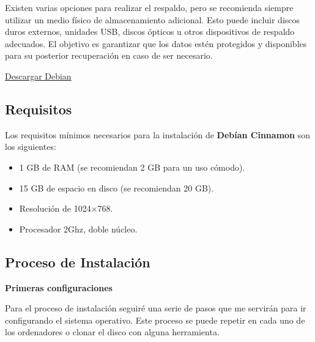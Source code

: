 Existen varias opciones para realizar el respaldo, pero se recomienda siempre utilizar un medio físico de almacenamiento adicional. Esto puede incluir discos duros externos, unidades USB, discos ópticos u otros dispositivos de respaldo adecuados. El objetivo es garantizar que los datos estén protegidos y disponibles para su posterior recuperación en caso de ser necesario.\par 
			
			\begin{tcolorbox}[enhanced,attach boxed title to top center={yshift=-3mm,yshifttext=-1mm},
				colback=blue!5!white,colframe=blue!75!black,colbacktitle=red!80!black,title= Debian,fonttitle=\bfseries, boxed title style={size=small,colframe=red!50!black} ]
		
				\centering
		
				\href{https://cdimage.debian.org/debian-cd/current/amd64/bt-dvd/}{\color{blue}{}Descargar Debian	}
			
			\end{tcolorbox}
				
			\subsection{Requisitos}
				
				Los requisitos mínimos necesarios para la instalación de \textbf{Debían Cinnamon} son los siguientes:
				
				\begin{itemize}
					
					\item 1 GB de RAM (se recomiendan 2 GB para un uso cómodo).
					\item 15 GB de espacio en disco (se recomiendan 20 GB).
					\item Resolución de 1024×768.
					\item Procesador 2Ghz, doble núcleo.
					
				\end{itemize}
			
			\subsection{Proceso de Instalación}
			
				\textbf{Primeras configuraciones}\par
			
				Para el proceso de instalación seguiré una serie de pasos que me servirán para ir configurando el sistema operativo. Este proceso se puede repetir en cada uno de los ordenadores o clonar el disco con alguna herramienta.
				
